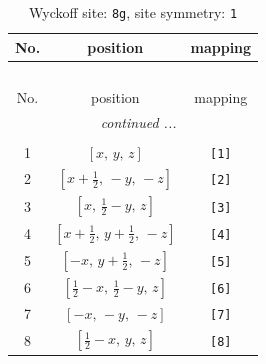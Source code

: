 \documentclass[fleqn,8pt]{jsarticle}
\begin{document}
\renewcommand{\arraystretch}{1.2}
\begin{longtable}{ccc}
\caption{Wyckoff site: {\tt 8g}, site symmetry: {\tt 1}}
 \\
 \hline \hline
No. & position & mapping \\ \hline \endfirsthead

\multicolumn{2}{l}{\tablename\ \thetable{}} \\
 \hline \hline
No. & position & mapping \\ \hline \endhead

 \hline \hline
\multicolumn{2}{r}{\footnotesize\it continued ...} \\ \endfoot

 \hline \hline
\multicolumn{2}{r}{} \\ \endlastfoot

1 & $\left[ x,\, y,\, z \right]$ & {\tt [1]} \\ \hline
2 & $\left[ x + \frac{1}{2},\, - y,\, - z \right]$ & {\tt [2]} \\ \hline
3 & $\left[ x,\, \frac{1}{2} - y,\, z \right]$ & {\tt [3]} \\ \hline
4 & $\left[ x + \frac{1}{2},\, y + \frac{1}{2},\, - z \right]$ & {\tt [4]} \\ \hline
5 & $\left[ - x,\, y + \frac{1}{2},\, - z \right]$ & {\tt [5]} \\ \hline
6 & $\left[ \frac{1}{2} - x,\, \frac{1}{2} - y,\, z \right]$ & {\tt [6]} \\ \hline
7 & $\left[ - x,\, - y,\, - z \right]$ & {\tt [7]} \\ \hline
8 & $\left[ \frac{1}{2} - x,\, y,\, z \right]$ & {\tt [8]} \\
\end{longtable}
\end{document}
